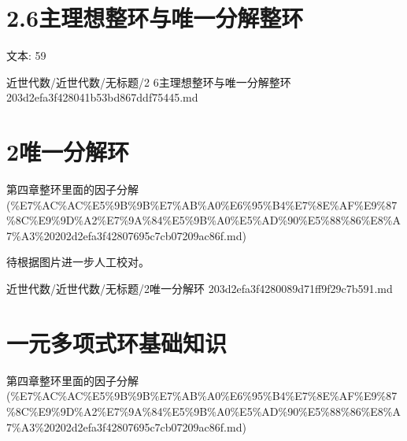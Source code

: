 \section*{2.6主理想整环与唯一分解整环}

\begin{note}[2.6主理想整环与唯一分解整环]

文本: 59

\end{note}

\begin{note}[来源路径]

近世代数/近世代数/无标题/2 6主理想整环与唯一分解整环 203d2efa3f428041b53bd867ddf75445.md

\end{note}

\section*{2唯一分解环}

\begin{note}[来源上级主题]

第四章整环里面的因子分解 (\%E7\%AC\%AC\%E5\%9B\%9B\%E7\%AB\%A0\%E6\%95\%B4\%E7\%8E\%AF\%E9\%87\%8C\%E9\%9D\%A2\%E7\%9A\%84\%E5\%9B\%A0\%E5\%AD\%90\%E5\%88\%86\%E8\%A7\%A3\%20202d2efa3f42807695c7cb07209ac86f.md)

\end{note}

\begin{note}[2唯一分解环]

待根据图片进一步人工校对。

\end{note}

\begin{note}[来源路径]

近世代数/近世代数/无标题/2唯一分解环 203d2efa3f4280089d71ff9f29c7b591.md

\end{note}

\section*{一元多项式环基础知识}

\begin{note}[来源上级主题]

第四章整环里面的因子分解 (\%E7\%AC\%AC\%E5\%9B\%9B\%E7\%AB\%A0\%E6\%95\%B4\%E7\%8E\%AF\%E9\%87\%8C\%E9\%9D\%A2\%E7\%9A\%84\%E5\%9B\%A0\%E5\%AD\%90\%E5\%88\%86\%E8\%A7\%A3\%20202d2efa3f42807695c7cb07209ac86f.md)

\end{note}

